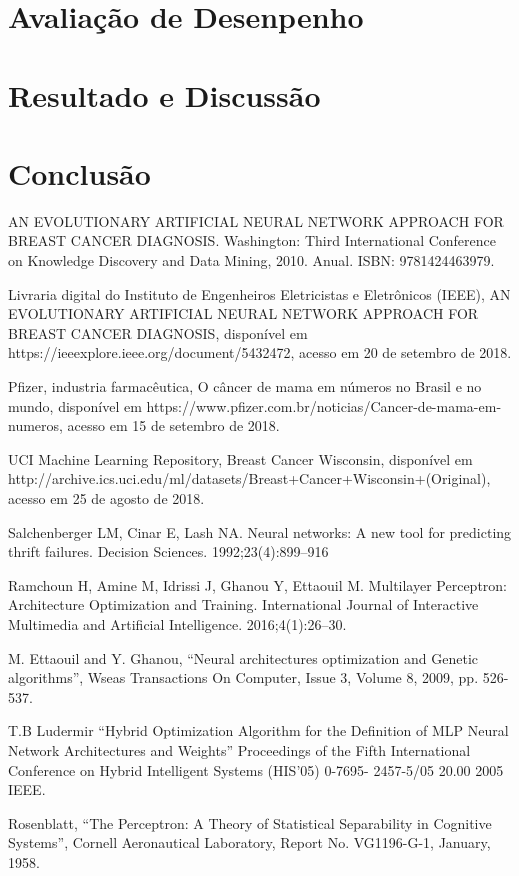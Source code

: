 \documentclass[conference]{IEEEtran}
\begin{document}
	
\section{Avaliação de Desenpenho}
  
\section{Resultado e Discussão}

   
    
\section*{Conclusão}

  

\begin{thebibliography}{00}

 AN EVOLUTIONARY ARTIFICIAL NEURAL NETWORK APPROACH FOR BREAST CANCER DIAGNOSIS. Washington: Third International Conference on Knowledge Discovery and Data Mining, 2010. Anual. ISBN: 9781424463979.

 Livraria digital do Instituto de Engenheiros Eletricistas e Eletrônicos (IEEE), AN EVOLUTIONARY ARTIFICIAL NEURAL NETWORK APPROACH FOR BREAST CANCER DIAGNOSIS, disponível em https://ieeexplore.ieee.org/document/5432472, acesso em 20 de setembro de 2018.

 Pfizer, industria farmacêutica, O câncer de mama em números no Brasil e no mundo, disponível em https://www.pfizer.com.br/noticias/Cancer-de-mama-em-numeros, acesso em 15 de setembro de 2018.

 UCI Machine Learning Repository, Breast Cancer Wisconsin, disponível em http://archive.ics.uci.edu/ml/datasets/Breast+Cancer+Wisconsin+(Original), acesso em 25 de agosto de 2018.

 Salchenberger LM, Cinar E, Lash NA. Neural networks: A new tool for predicting thrift failures. Decision Sciences. 1992;23(4):899–916

 Ramchoun H, Amine M, Idrissi J, Ghanou Y, Ettaouil M. Multilayer Perceptron: Architecture Optimization and Training. International Journal of Interactive Multimedia and Artificial Intelligence. 2016;4(1):26–30.

 M. Ettaouil and Y. Ghanou, “Neural architectures optimization and Genetic algorithms”, Wseas Transactions On Computer, Issue 3, Volume 8, 2009, pp. 526-537. 

 T.B Ludermir “Hybrid Optimization Algorithm for the Definition of MLP Neural Network Architectures and Weights” Proceedings of the Fifth International Conference on Hybrid Intelligent Systems (HIS’05) 0-7695- 2457-5/05 20.00 2005 IEEE.

 Rosenblatt, “The Perceptron: A Theory of Statistical Separability in Cognitive Systems”, Cornell Aeronautical Laboratory, Report No. VG1196-G-1, January, 1958. 

\end{thebibliography}
\end{document}
